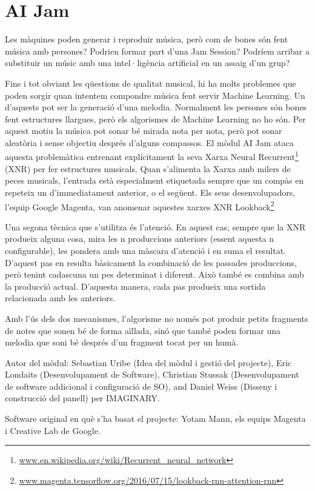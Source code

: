 \section{AI Jam}
Les màquines poden generar i reproduir música, però com de bones són fent música amb persones? Podrien formar part d'una Jam Session?
Podríem arribar a substituir un músic amb una intel·ligència artificial en un assaig d'un grup?

Fins i tot obviant les qüestions de qualitat musical, hi ha molts problemes que poden sorgir quan intentem compondre música fent servir Machine Learning. Un d'aquests pot ser la generació d'una melodia. Normalment les persones són bones fent estructures llargues, però els algorismes de Machine Learning no ho són. Per aquest motiu la música pot sonar bé mirada nota per nota, però pot sonar aleatòria i sense objectiu després d'alguns compassos. El mòdul AI Jam ataca aquesta problemàtica entrenant explícitament la seva Xarxa Neural Recurrent\footnote{\url{www.en.wikipedia.org/wiki/Recurrent_neural_network}} (XNR) per fer estructures musicals. Quan s'alimenta la Xarxa amb milers de peces musicals, l'entrada està especialment etiquetada sempre que un compàs en repeteix un d'immediatament anterior, o el següent. Els seus desenvolupadors, l'equip Google Magenta, van anomenar aquestes xarxes XNR Lookback\footnote{\url{www.magenta.tensorflow.org/2016/07/15/lookback-rnn-attention-rnn}}

Una segona tècnica que s'utilitza és l'atenció. En aquest cas, sempre que la XNR produeix alguna cosa, mira les n produccions anteriors (essent aquesta n configurable), les pondera amb una màscara d'atenció i en suma el resultat. D'aquest pas en resulta bàsicament la combinació de les passades produccions, però tenint cadascuna un pes determinat i diferent. Això també es combina amb la producció actual. D'aquesta manera, cada pas produeix una sortida relacionada amb les anteriors.

Amb l'ús dels dos mecanismes, l'algorisme no només pot produir petits fragments de notes que sonen bé de forma aïllada, sinó que també poden formar una melodia que soni bé després d'un fragment tocat per un humà.

\begin{sectcredits}

\item[Autor del mòdul:] Sebastian Uribe (Idea del mòdul i gestió del projecte), Eric Londaits (Desenvolupament de Software), Christian Stussak (Desenvolupament de software addicional i configuració de SO), and Daniel Weiss (Disseny i construcció del panell) per IMAGINARY.
\item[Software original en què s'ha basat el projecte:] Yotam Mann, els equips Magenta i Creative Lab de Google.
\end{sectcredits}

